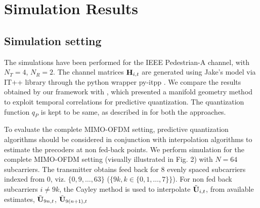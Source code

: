 \documentclass[conference]{IEEEtran}
\begin{document}
{%


\section{Simulation Results}
\label{section4}

\subsection{Simulation setting}
\label{setting}

\noindent The simulations have been performed for the IEEE Pedestrian-A channel, with $N_T=4$, $N_R=2$.  The channel matrices ${\bf H}_{i,t}$ are generated using Jake's model via IT++ library through the python wrapper py-itpp \cite{ViditPy}.
We compare the results obtained by our framework with \cite{6891198}, which presented a manifold geometry method to exploit temporal correlations for predictive quantization.
The quantization function $q_P$ is kept to be same, as described in \cite{6545375,6891198,Gupt1905:Predictive} for both the approaches.

To evaluate the complete MIMO-OFDM setting, predictive quantization algorithms should be considered in conjunction with interpolation algorithms to estimate the precoders at non fed-back points.
We perform simulation for the complete MIMO-OFDM setting (visually illustrated in Fig. 2) with $N=64$ subcarriers. The transmitter obtains feed back for $8$ evenly spaced subcarriers indexed from 0, viz. $\{0,9,\ldots,63\}$ ($\{9k, k \in \{0,1,\ldots,7\}\}$). For non fed back subcarriers $i\neq 9k$, the Cayley method \cite{Gupt1905:Predictive} is used to interpolate $\tilde{{\bf U}}_{i,t}$, from available estimates, $\tilde{{\bf U}}_{9n,t}$, $\tilde{{\bf U}}_{9(n+1), t}$ 

}
\end{document}
